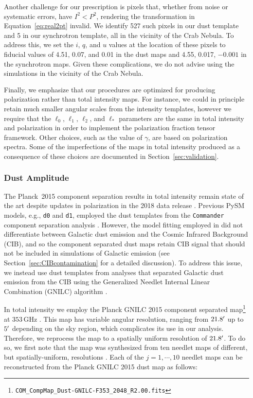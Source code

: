 \documentclass[twocolumn]{aastex631}
\begin{document}
Another challenge for our prescription is pixels that, whether from noise or systematic errors, have $I^2 < P^2$, rendering the transformation in Equation~\ref{eq:real2pt} invalid. We identify 527 such pixels in our dust template and 5 in our synchrotron template, all in the vicinity of the Crab Nebula. To address this, we set the $i$, $q$, and $u$ values at the location of these pixels to fiducial values of 4.51, 0.07, and 0.01 in the dust maps and 4.55, 0.017, $-0.001$ in the synchrotron maps. Given these complications, we do not advise using the simulations in the vicinity of the Crab Nebula.

Finally, we emphasize that our procedures are optimized for producing polarization rather than total intensity maps. For instance, we could in principle retain much smaller angular scales from the intensity templates, however we require that the $\ell_0$, $\ell_1$, $\ell_2$, and $\ell_*$ parameters are the same in total intensity and polarization in order to implement the polarization fraction tensor framework. Other choices, such as the value of $\gamma$, are based on polarization spectra. Some of the imperfections of the maps in total intensity produced as a consequence of these choices are documented in Section~\ref{sec:validation}.

\subsubsection{Dust Amplitude}\label{sec:dustamplitude}
The Planck~2015 component separation results in total intensity remain state of the art despite updates in polarization in the 2018 data release \citep{planck2016-l04}. Previous PySM models, e.g., \texttt{d0} and \texttt{d1}, employed the dust templates from the \texttt{Commander} component separation analysis \citep{planck2014-a11}. However, the model fitting employed in \citet{planck2014-a11} did not differentiate between Galactic dust emission and the Cosmic Infrared Background (CIB), and so the component separated dust maps retain CIB signal that should not be included in simulations of Galactic emission (see Section~\ref{sec:CIBcontamination} for a detailed discussion). To address this issue, we instead use dust templates from analyses that separated Galactic dust emission from the CIB using the Generalized Needlet Internal Linear Combination (GNILC) algorithm \citep{Remazeilles:2011}. 

In total intensity we employ the Planck GNILC 2015 component separated map\footnote{\texttt{COM\_CompMap\_Dust-GNILC-F353\_2048\_R2.00.fits}} at $353$\,GHz \citep{planck2016-XLVIII}. This map has variable angular resolution, ranging from $21.8\mbox{$^\prime$}$ up to $5\mbox{$^\prime$}$ depending on the sky region, which complicates its use in our analysis. Therefore, we reprocess the map to a spatially uniform resolution of $21.8\mbox{$^\prime$}$. To do so, we first note that the map was synthesized from ten needlet maps of different, but spatially-uniform, resolutions \citep[][Figure~A.2]{planck2016-XLVIII}. Each of the $j=1,\cdots,10$ needlet maps can be reconstructed from the Planck GNILC 2015 dust map as follows:
\end{document}
